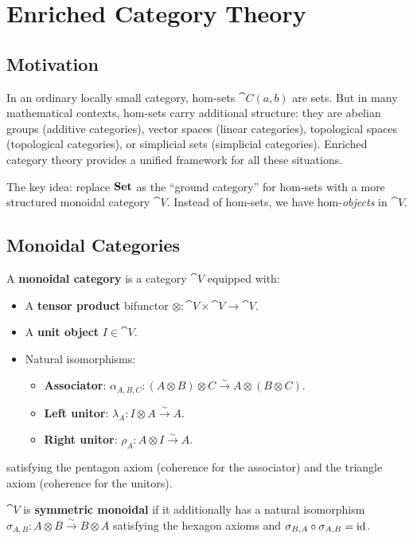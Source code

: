 \chapter{Enriched Category Theory}
\label{ch:enriched}

\section{Motivation}

In an ordinary locally small category, hom-sets $\cat{C}(a,b)$ are sets. But in many mathematical contexts, hom-sets carry additional structure: they are abelian groups (additive categories), vector spaces (linear categories), topological spaces (topological categories), or simplicial sets (simplicial categories). Enriched category theory provides a unified framework for all these situations.

The key idea: replace $\mathbf{Set}$ as the ``ground category'' for hom-sets with a more structured monoidal category $\cat{V}$. Instead of hom-sets, we have hom-\emph{objects} in $\cat{V}$.

\section{Monoidal Categories}

\begin{definition}
A \textbf{monoidal category} is a category $\cat{V}$ equipped with:
\begin{itemize}
  \item A \textbf{tensor product} bifunctor $\otimes: \cat{V} \times \cat{V} \to \cat{V}$.
  \item A \textbf{unit object} $I \in \cat{V}$.
  \item Natural isomorphisms:
  \begin{itemize}
    \item \textbf{Associator}: $\alpha_{A,B,C}: (A \otimes B) \otimes C \xrightarrow{\sim} A \otimes (B \otimes C)$.
    \item \textbf{Left unitor}: $\lambda_A: I \otimes A \xrightarrow{\sim} A$.
    \item \textbf{Right unitor}: $\rho_A: A \otimes I \xrightarrow{\sim} A$.
  \end{itemize}
\end{itemize}
satisfying the pentagon axiom (coherence for the associator) and the triangle axiom (coherence for the unitors).

$\cat{V}$ is \textbf{symmetric monoidal} if it additionally has a natural isomorphism $\sigma_{A,B}: A \otimes B \xrightarrow{\sim} B \otimes A$ satisfying the hexagon axioms and $\sigma_{B,A} \circ \sigma_{A,B} = \mathrm{id}$.
\end{definition}

